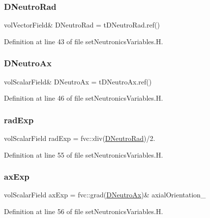 \subsubsection{\texorpdfstring{D\+Neutro\+Rad}{DNeutroRad}}
{\footnotesize\ttfamily vol\+Vector\+Field\& D\+Neutro\+Rad = t\+D\+Neutro\+Rad.\+ref()}



Definition at line 43 of file set\+Neutronics\+Variables.\+H.

\mbox{\label{setNeutronicsVariables_8H_acbede4ae4993afe497317c8781340cb6}} 
\subsubsection{\texorpdfstring{D\+Neutro\+Ax}{DNeutroAx}}
{\footnotesize\ttfamily vol\+Scalar\+Field\& D\+Neutro\+Ax = t\+D\+Neutro\+Ax.\+ref()}



Definition at line 46 of file set\+Neutronics\+Variables.\+H.

\mbox{\label{setNeutronicsVariables_8H_aa05feccdc89593a9e6aa6a71e66ba849}} 
\subsubsection{\texorpdfstring{rad\+Exp}{radExp}}
{\footnotesize\ttfamily vol\+Scalar\+Field rad\+Exp = fvc\+::div(\hyperlink{setNeutronicsVariablesLowMem_8H_a87a8e73540cc64ca6321cea333ded9ac}{D\+Neutro\+Rad})/2.}



Definition at line 55 of file set\+Neutronics\+Variables.\+H.

\mbox{\label{setNeutronicsVariables_8H_a0a73dc65b2186db6b029ee203c1b2a00}} 
\subsubsection{\texorpdfstring{ax\+Exp}{axExp}}
{\footnotesize\ttfamily vol\+Scalar\+Field ax\+Exp = fvc\+::grad(\hyperlink{setNeutronicsVariablesLowMem_8H_acbede4ae4993afe497317c8781340cb6}{D\+Neutro\+Ax})\& axial\+Orientation\+\_\+}



Definition at line 56 of file set\+Neutronics\+Variables.\+H.

